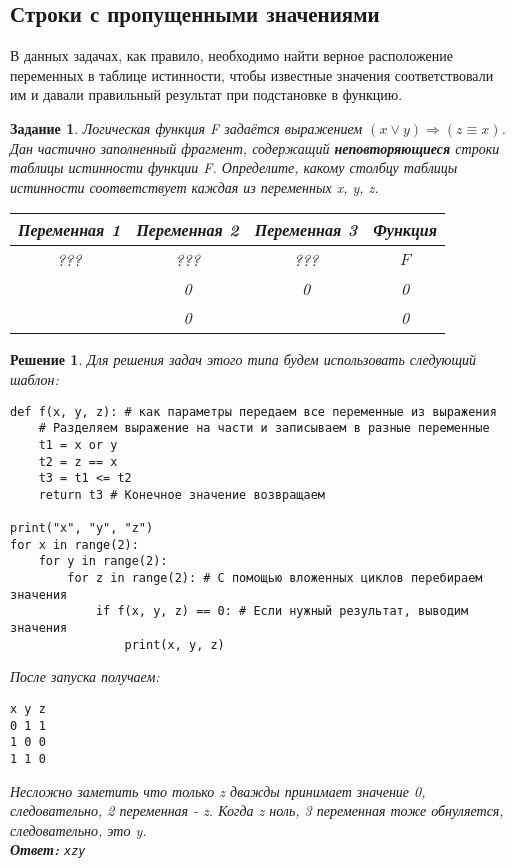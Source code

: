 \documentclass[12pt]{article}
\theoremstyle{problem_style}
\newtheorem{problem}{Задание}[subsection]
\newtheorem{solution}{Решение}[subsection]
\begin{document}
\subsection{Строки с пропущенными значениями}
В данных задачах, как правило, необходимо найти верное расположение переменных в таблице истинности, чтобы известные значения соответствовали им и давали правильный результат при подстановке в функцию.
\begin{problem}
Логическая функция F задаётся выражением \((x \lor y) \Rightarrow (z \equiv x)\).\\
Дан частично заполненный фрагмент, содержащий \textbf{неповторяющиеся} строки таблицы истинности функции F. Определите, какому столбцу таблицы истинности соответствует каждая из переменных x, y, z.
\begin{table}[ht]
\centering
\begin{tabular}{|c|c|c|c|}
    \hline
    \textbf{Переменная 1} & \textbf{Переменная 2} & \textbf{Переменная 3} & \textbf{Функция} \\ 
    \hline
    ??? & ??? & ??? & $F$ \\ 
    \hline
         & 0   & 0   & 0 \\ 
    \hline
         & 0   &     & 0 \\ 
    \hline
\end{tabular}
\end{table}
\end{problem}
\begin{solution}
Для решения задач этого типа будем использовать следующий шаблон:

\begin{verbatim}
def f(x, y, z): # как параметры передаем все переменные из выражения
    # Разделяем выражение на части и записываем в разные переменные
    t1 = x or y 
    t2 = z == x
    t3 = t1 <= t2
    return t3 # Конечное значение возвращаем

print("x", "y", "z")
for x in range(2): 
    for y in range(2):
        for z in range(2): # С помощью вложенных циклов перебираем значения
            if f(x, y, z) == 0: # Если нужный результат, выводим значения
                print(x, y, z)
\end{verbatim}
После запуска получаем:
\begin{verbatim}
x y z
0 1 1
1 0 0
1 1 0
\end{verbatim}
Несложно заметить что только z дважды принимает значение 0, следовательно, 2 переменная - z. Когда z ноль, 3 переменная тоже обнуляется, следовательно, это y.\\
\textbf{Ответ:} \texttt{xzy}
\end{solution}
\end{document}
